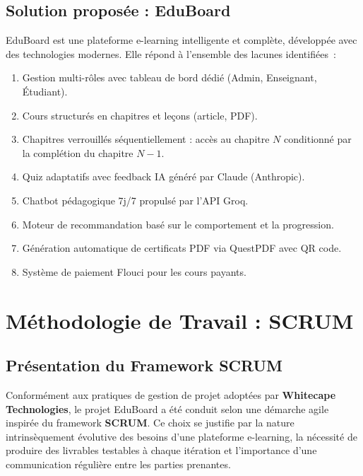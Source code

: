 \subsection{Solution proposée : EduBoard}

EduBoard est une plateforme e-learning intelligente et complète, développée avec des
technologies modernes. Elle répond à l'ensemble des lacunes identifiées~:

\begin{enumerate}
  \item Gestion multi-rôles avec tableau de bord dédié (Admin, Enseignant, Étudiant).
  \item Cours structurés en chapitres et leçons (article, PDF).
  \item Chapitres verrouillés séquentiellement : accès au chapitre $N$ conditionné
        par la complétion du chapitre $N-1$.
  \item Quiz adaptatifs avec feedback \ac{IA} généré par Claude (Anthropic).
  \item Chatbot pédagogique 7j/7 propulsé par l'API Groq.
  \item Moteur de recommandation basé sur le comportement et la progression.
  \item Génération automatique de certificats PDF via QuestPDF avec QR code.
  \item Système de paiement Flouci pour les cours payants.
\end{enumerate}

\section{Méthodologie de Travail : SCRUM}

\subsection{Présentation du Framework SCRUM}

\noindent Conformément aux pratiques de gestion de projet adoptées par \textbf{Whitecape Technologies}, le projet EduBoard a été conduit selon une démarche agile inspirée du framework \textbf{SCRUM}. Ce choix se justifie par la nature intrinsèquement évolutive des besoins d'une plateforme e-learning, la nécessité de produire des livrables testables à chaque itération et l'importance d'une communication régulière entre les parties prenantes.

\vspace{0.5cm}

